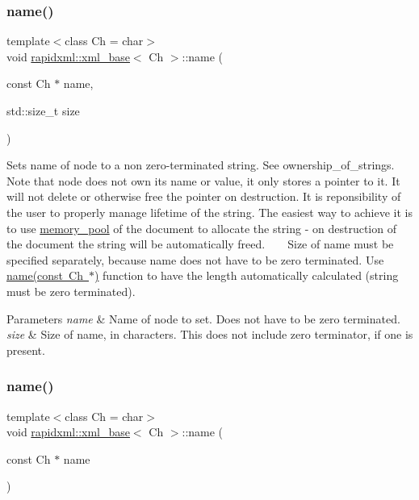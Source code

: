 \subsubsection{\texorpdfstring{name()}{name()}\hspace{0.1cm}{\footnotesize\ttfamily [4/6]}}
{\footnotesize\ttfamily template$<$class Ch  = char$>$ \\
void \mbox{\hyperlink{classrapidxml_1_1xml__base}{rapidxml\+::xml\+\_\+base}}$<$ Ch $>$\+::name (\begin{DoxyParamCaption}\item[{const Ch $\ast$}]{name,  }\item[{std\+::size\+\_\+t}]{size }\end{DoxyParamCaption})\hspace{0.3cm}{\ttfamily [inline]}}

Sets name of node to a non zero-\/terminated string. See ownership\+\_\+of\+\_\+strings. ~\newline
~\newline
 Note that node does not own its name or value, it only stores a pointer to it. It will not delete or otherwise free the pointer on destruction. It is reponsibility of the user to properly manage lifetime of the string. The easiest way to achieve it is to use \mbox{\hyperlink{classrapidxml_1_1memory__pool}{memory\+\_\+pool}} of the document to allocate the string -\/ on destruction of the document the string will be automatically freed. ~\newline
~\newline
 Size of name must be specified separately, because name does not have to be zero terminated. Use \mbox{\hyperlink{classrapidxml_1_1xml__base_a4611ddc82ac83a527c65606600eb2a0d}{name(const Ch $\ast$)}} function to have the length automatically calculated (string must be zero terminated). 
\begin{DoxyParams}{Parameters}
{\em name} & Name of node to set. Does not have to be zero terminated. \\
\hline
{\em size} & Size of name, in characters. This does not include zero terminator, if one is present. \\
\hline
\end{DoxyParams}
\mbox{\label{classrapidxml_1_1xml__base_a4611ddc82ac83a527c65606600eb2a0d}} 
\subsubsection{\texorpdfstring{name()}{name()}\hspace{0.1cm}{\footnotesize\ttfamily [5/6]}}
{\footnotesize\ttfamily template$<$class Ch  = char$>$ \\
void \mbox{\hyperlink{classrapidxml_1_1xml__base}{rapidxml\+::xml\+\_\+base}}$<$ Ch $>$\+::name (\begin{DoxyParamCaption}\item[{const Ch $\ast$}]{name }\end{DoxyParamCaption})\hspace{0.3cm}{\ttfamily [inline]}}

